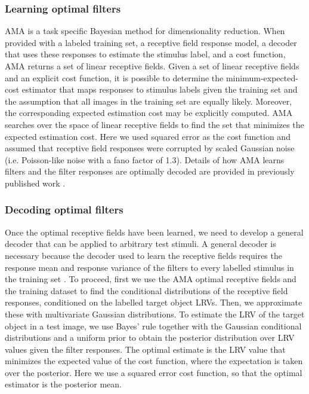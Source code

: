 \documentclass{jov}
\begin{document}
\subsubsection*{Learning optimal filters}
AMA is a task specific Bayesian method for dimensionality reduction.
When provided with a labeled training set, a receptive field response model, a decoder that uses these responses to estimate the stimulus label, and a cost function, AMA returns a set of linear receptive fields.
Given a set of linear receptive fields and an explicit cost function, it is possible to determine the minimum-expected-cost estimator that maps responses to stimulus labels given the training set and the 
assumption that all images in the training set are equally likely.
Moreover, the corresponding expected estimation cost may be explicitly computed.
AMA searches over the space of linear receptive fields to find the set that minimizes the expected estimation cost.
Here we used squared error as the cost function and assumed that receptive field responses were corrupted by scaled Gaussian noise (i.e. Poisson-like noise with a fano factor of 1.3).
Details of how AMA learns filters and the filter responses are optimally decoded are provided in previously published work \cite{geisler2009optimal,burge2017accuracy,jaini2017linking}.

\subsubsection*{Decoding optimal filters}

Once the optimal receptive fields have been learned, we need to develop a general decoder that can be applied to arbitrary test stimuli.
A general decoder is necessary because the decoder used to learn the receptive fields requires the response mean and response variance of the filters to every labelled stimulus in the training set \cite{geisler2009optimal,burge2017accuracy}.
To proceed, first we use the AMA optimal receptive fields and the training dataset to find the conditional distributions of the receptive field responses, conditioned on the labelled target object LRVs.
Then, we approximate these with multivariate Gaussian distributions.
To estimate the LRV of the target object in a test image, we use Bayes' rule together with the Gaussian conditional distributions and a uniform prior to obtain the posterior distribution over LRV values given the filter responses.
The optimal estimate is the LRV value that minimizes the expected value of the cost function, where the expectation is taken over the posterior.
Here we use a squared error cost function, so that the optimal estimator is the posterior mean.
\end{document}

